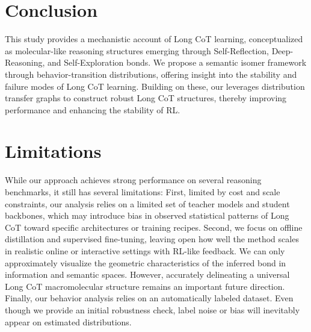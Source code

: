 \section{Conclusion}
This study provides a mechanistic account of Long CoT learning, conceptualized as molecular-like reasoning structures emerging through Self-Reflection, Deep-Reasoning, and Self-Exploration bonds. We propose a semantic isomer framework through behavior-transition distributions, offering insight into the stability and failure modes of Long CoT learning. Building on these, our \method leverages distribution transfer graphs to construct robust Long CoT structures, thereby improving  performance and enhancing the stability of RL.

\newpage
\section*{Limitations}
While our approach achieves strong performance on several reasoning benchmarks, it still has several limitations:
First, limited by cost and scale constraints, our analysis relies on a limited set of teacher models and student backbones, which may introduce bias in observed statistical patterns of Long CoT toward specific architectures or training recipes. Second, we focus on offline distillation and supervised fine-tuning, leaving open how well the method scales in realistic online or interactive settings with RL-like feedback. We can only approximately visualize the geometric characteristics of the inferred bond in information and semantic spaces. However, accurately delineating a universal Long CoT macromolecular structure remains an important future direction. Finally, our behavior analysis relies on an automatically labeled dataset. Even though we provide an initial robustness check,  label noise or bias will inevitably appear on estimated distributions.
